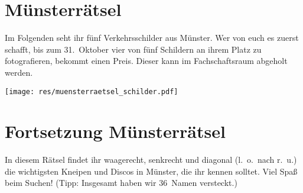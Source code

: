 \section{Münsterrätsel}
Im Folgenden seht ihr fünf Verkehrsschilder aus Münster.
Wer von euch es zuerst schafft, bis zum 31.~Oktober vier von fünf Schildern an ihrem Platz zu fotografieren, bekommt einen Preis.
Dieser kann im Fachschaftsraum abgeholt werden.

\begin{center}
	\texttt{[image: res/muensterraetsel\_schilder.pdf]}
\end{center}

\section*{Fortsetzung Münsterrätsel}
In diesem Rätsel findet ihr waagerecht, senkrecht und diagonal (l.\ o.\ nach r.\ u.) die wichtigsten Kneipen und Discos in Münster, die ihr kennen solltet.
Viel Spaß beim Suchen! (Tipp: Insgesamt haben wir 36~Namen versteckt.)

